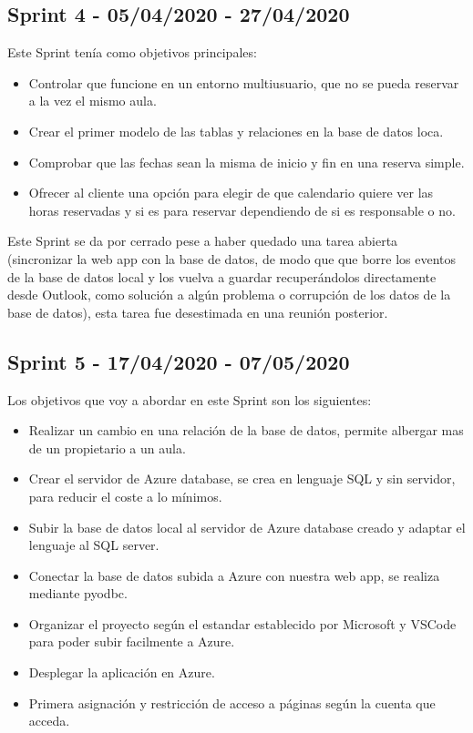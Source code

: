 \subsection{Sprint 4 - 05/04/2020 - 27/04/2020}
Este Sprint tenía como objetivos principales:
\begin{itemize}
    \item Controlar que funcione en un entorno multiusuario, que no se pueda reservar a la vez el mismo aula.
    \item Crear el primer modelo de las tablas y relaciones en la base de datos loca.
    \item Comprobar que las fechas sean la misma de inicio y fin en una reserva simple.
    \item Ofrecer al cliente una opción para elegir de que calendario quiere ver las horas reservadas y si es para reservar dependiendo de si es responsable o no.
\end{itemize}
Este Sprint se da por cerrado pese a haber quedado una tarea abierta (sincronizar la web app con la base de datos, de modo que que borre los eventos de la base de datos local y los vuelva a guardar recuperándolos directamente desde Outlook, como solución a algún problema o corrupción de los datos de la base de datos), esta tarea fue desestimada en una reunión posterior.
\subsection{Sprint 5 - 17/04/2020 - 07/05/2020}
Los objetivos que voy a abordar en este Sprint son los siguientes:
\begin{itemize}
    \item Realizar un cambio en una relación de la base de datos, permite albergar mas de un propietario a un aula.
    \item Crear el servidor de Azure database, se crea en lenguaje SQL y sin servidor, para reducir el coste a lo mínimos.
    \item Subir la base de datos local al servidor de Azure database creado y adaptar el lenguaje al SQL server.
    \item Conectar la base de datos subida a Azure con nuestra web app, se realiza mediante pyodbc.
    \item Organizar el proyecto según el estandar establecido por Microsoft y VSCode para poder subir facilmente a Azure.
    \item Desplegar la aplicación en Azure.
    \item Primera asignación y restricción de acceso a páginas según la cuenta que acceda.
\end{itemize}

